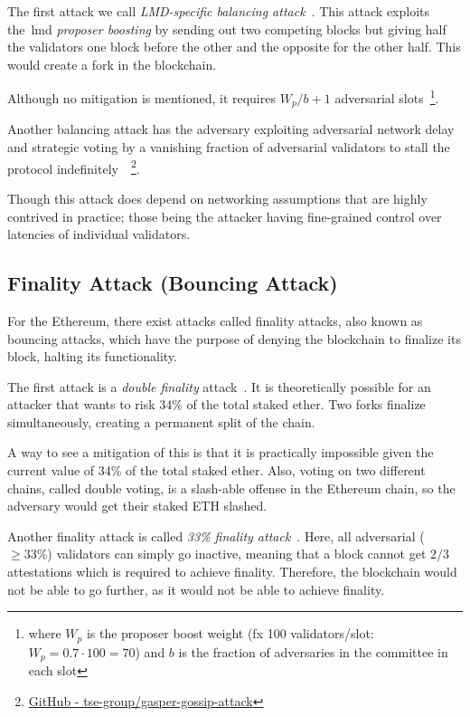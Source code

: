 The first attack we call \textit{LMD-specific balancing attack}~\cite{10.1145/3560829.3563560}.
This attack exploits the~\gls{lmd} \textit{proposer
boosting} by sending out two competing blocks
but giving half the validators one block before the other and the opposite for the other half.
This would create a fork in the blockchain.

Although no mitigation is mentioned,
it requires $W_p/b+1$ adversarial slots~\footnote{where $W_p$ is the proposer boost weight (fx 100 validators/slot: $W_p=0.7\cdot100=70$)
    and $b$ is the fraction of adversaries in the committee in each slot}.


Another balancing attack has the adversary
exploiting adversarial network delay
and strategic voting by a vanishing fraction of adversarial validators
to stall the protocol indefinitely~\cite{10.1007/978-3-031-18283-9_28}~\footnote{
\href{https://github.com/tse-group/gasper-gossip-attack}{GitHub - tse-group/gasper-gossip-attack}}.

Though this attack does depend on networking assumptions that are highly contrived in practice;
those being the attacker having fine-grained control over latencies of individual validators.

\subsection{Finality Attack (Bouncing Attack)}\label{subsec:finality-attack-(bouncing-attack)}
For the Ethereum, there exist attacks called finality attacks, also known as bouncing attacks,
which have the purpose of denying the blockchain to finalize its block, halting its functionality.

The first attack is a \textit{double finality} attack~\cite{EthereumAttackDefense2024, 10646904}.
It is theoretically possible for an attacker that wants to risk 34\% of the total staked ether.
Two forks finalize simultaneously, creating a permanent split of the chain.

A way to see a mitigation of this is
that it is practically impossible given the current value of 34\% of the total staked ether.
Also, voting on two different chains, called double voting, is a slash-able offense in the Ethereum chain,
so the adversary would get their staked ETH slashed.


Another finality attack is called \textit{33\% finality attack}~\cite{EthereumAttackDefense2024}.
Here, all adversarial ($\geq33\%$) validators can simply go inactive,
meaning that a block cannot get $2/3$ attestations which is required to achieve finality.
Therefore, the blockchain would not be able to go further, as it would not be able to achieve finality.

